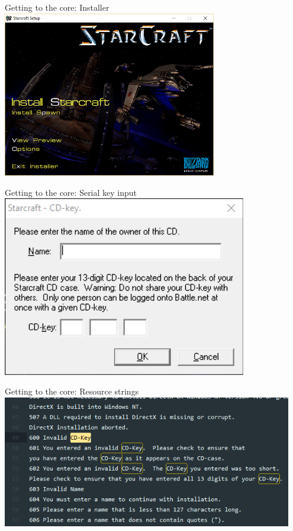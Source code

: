 \documentclass[10pt, compress, aspectratio=169]{beamer}
\begin{document}
\begin{frame}{Getting to the core: Installer}
	\includegraphics[width=0.7\textwidth]{images/sc1-1-setup.png}
\end{frame}

\begin{frame}{Getting to the core: Serial key input}
	\includegraphics[width=0.8\textwidth]{images/sc1-2-input-key.png}
\end{frame}

\begin{frame}{Getting to the core: Resource strings}
	\includegraphics[width=0.95\textwidth]{images/sc1-3-resources-strings.png}
\end{frame}
\end{document}
